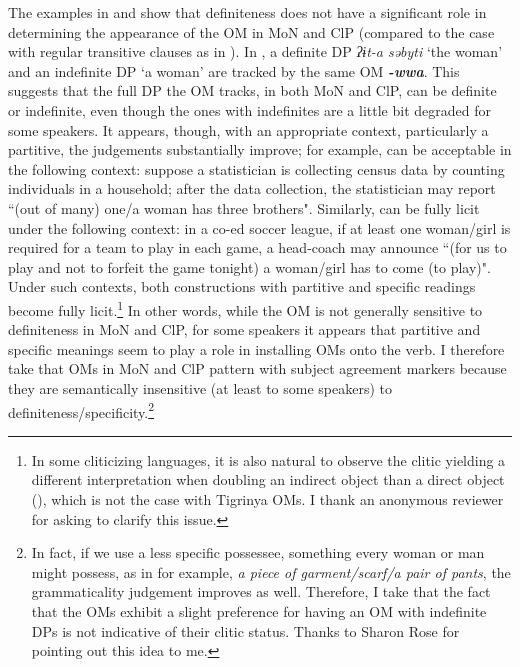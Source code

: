 \documentclass[output=paper]{langscibook}
\begin{document}
\noindent The examples in  and  show that definiteness does not have a significant role in determining the appearance of the OM in MoN and ClP (compared to the case with regular transitive clauses as in ). In , a definite DP {\emph{ʔɨt-a səbyti}} `the woman' and an indefinite DP `a woman'  are tracked by the same OM {\textbf{\emph{-wwa}}}. This suggests that the full DP the OM tracks, in both MoN and ClP, can be definite or indefinite, even though the ones with indefinites are a little bit degraded for some speakers. It appears, though, with an appropriate context, particularly a partitive, the judgements substantially improve; for example,  can be acceptable in the following context: suppose a statistician is collecting census data by counting individuals in a household; after the data collection, the statistician may report ``(out of many) one/a woman has three brothers". Similarly,  can be fully licit under the following context: in a co-ed soccer league, if at least one woman/girl is required for a team to play in each game, a head-coach may announce ``(for us to play and not to forfeit the game tonight) a woman/girl has to come (to play)". Under such contexts, both constructions with partitive and specific readings become fully licit.\footnote{In some cliticizing languages, it is also natural to observe the clitic yielding a different interpretation when doubling an indirect object than a direct object (\citealt{bleam99}), which is not the case with Tigrinya OMs. I thank an anonymous reviewer for asking to clarify this issue.} In other words, while the OM is not generally sensitive to definiteness in MoN and ClP, for some speakers it appears that partitive and specific meanings seem to play a role in installing OMs onto the verb. I therefore take that OMs in MoN and ClP pattern with subject agreement markers because they are semantically insensitive (at least to some speakers) to definiteness/specificity.\footnote{ In fact, if we use a less specific possessee, something every woman or man might possess, as in for example, \textit{a piece of garment/scarf/a pair of pants}, the grammaticality judgement improves as well. Therefore, I take that the fact that the OMs exhibit a slight preference for having an OM with indefinite DPs is not indicative of their clitic status. Thanks to Sharon Rose for pointing out this idea to me.}
\end{document}
